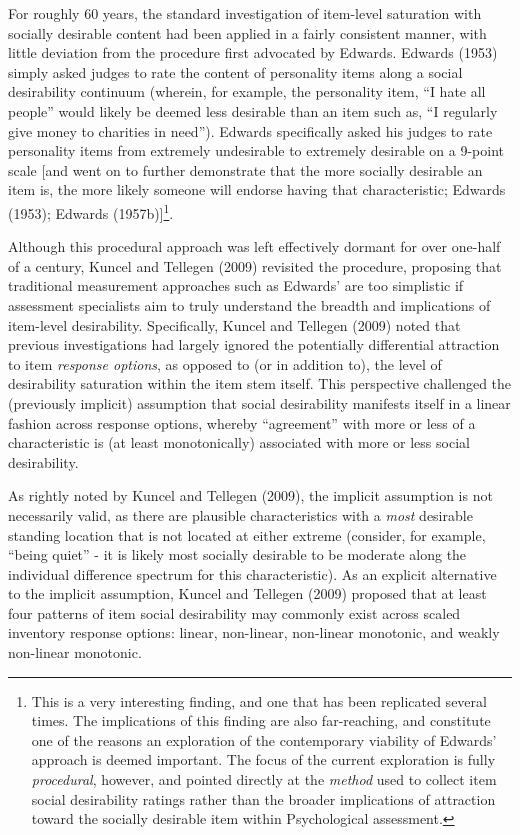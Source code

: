 \documentclass[
  ,man]{apa6}
\begin{document}
For roughly 60 years, the standard investigation of item-level saturation with socially desirable content had been applied in a fairly consistent manner, with little deviation from the procedure first advocated by Edwards. Edwards (1953) simply asked judges to rate the content of personality items along a social desirability continuum (wherein, for example, the personality item, ``I hate all people'' would likely be deemed less desirable than an item such as, ``I regularly give money to charities in need''). Edwards specifically asked his judges to rate personality items from extremely undesirable to extremely desirable on a 9-point scale {[}and went on to further demonstrate that the more socially desirable an item is, the more likely someone will endorse having that characteristic; Edwards (1953); Edwards (1957b){]}\footnote{This is a very interesting finding, and one that has been replicated several times. The implications of this finding are also far-reaching, and constitute one of the reasons an exploration of the contemporary viability of Edwards' approach is deemed important. The focus of the current exploration is fully \emph{procedural}, however, and pointed directly at the \emph{method} used to collect item social desirability ratings rather than the broader implications of attraction toward the socially desirable item within Psychological assessment.}.

Although this procedural approach was left effectively dormant for over one-half of a century, Kuncel and Tellegen (2009) revisited the procedure, proposing that traditional measurement approaches such as Edwards' are too simplistic if assessment specialists aim to truly understand the breadth and implications of item-level desirability. Specifically, Kuncel and Tellegen (2009) noted that previous investigations had largely ignored the potentially differential attraction to item \emph{response options}, as opposed to (or in addition to), the level of desirability saturation within the item stem itself. This perspective challenged the (previously implicit) assumption that social desirability manifests itself in a linear fashion across response options, whereby ``agreement'' with more or less of a characteristic is (at least monotonically) associated with more or less social desirability.

As rightly noted by Kuncel and Tellegen (2009), the implicit assumption is not necessarily valid, as there are plausible characteristics with a \emph{most} desirable standing location that is not located at either extreme (consider, for example, ``being quiet'' - it is likely most socially desirable to be moderate along the individual difference spectrum for this characteristic). As an explicit alternative to the implicit assumption, Kuncel and Tellegen (2009) proposed that at least four patterns of item social desirability may commonly exist across scaled inventory response options: linear, non-linear, non-linear monotonic, and weakly non-linear monotonic.
\end{document}
